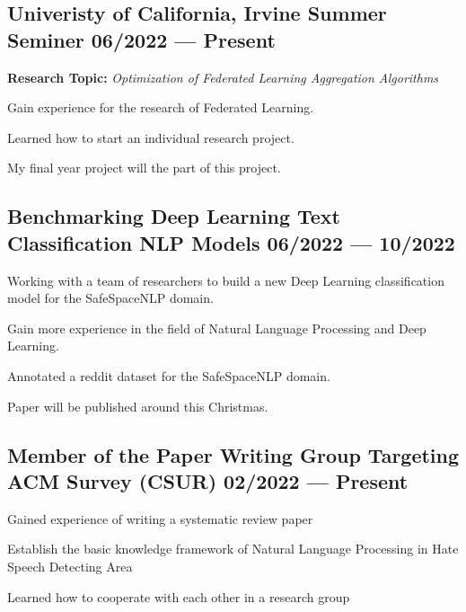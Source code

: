 \documentclass[letter,10pt]{article}
\begin{document}

\subsection{{Univeristy of California, Irvine Summer Seminer \hfill 06/2022 --- Present}}
\begin{zitemize}
\item \textbf{Research Topic:} \textit{Optimization of Federated Learning Aggregation Algorithms}
\item Gain experience for the research of Federated Learning.
\item Learned how to start an individual research project.
\item My final year project will the part of this project.
\end{zitemize}

\subsection{{Benchmarking Deep Learning Text Classification NLP Models \hfill 06/2022 --- 10/2022}}
\begin{zitemize}
\item Working with a team of researchers to build a new Deep Learning classification model for the SafeSpaceNLP domain.
\item Gain more experience in the field of Natural Language Processing and Deep Learning.
\item Annotated a reddit dataset for the SafeSpaceNLP domain.
\item Paper will be published around this Christmas.
\end{zitemize}

\subsection{{Member of the Paper Writing Group Targeting ACM Survey (CSUR) \hfill 02/2022 --- Present}}
\begin{zitemize}
\item Gained experience of writing a systematic review paper
\item Establish the basic knowledge framework of Natural Language Processing in Hate Speech Detecting Area
\item Learned how to cooperate with each other in a research group
\end{zitemize}
\end{document}
